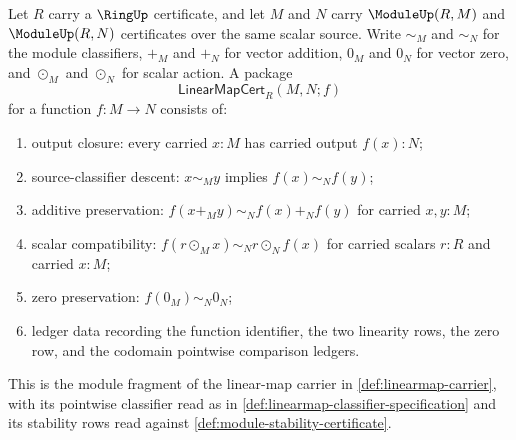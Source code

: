\begin{definition}
\label{def:module-linearmap-certificate-package}
Let $R$ carry a $\RingUp$ certificate, and let $M$ and $N$ carry $\ModuleUp(R,M)$ and $\ModuleUp(R,N)$ certificates over the same scalar source. Write $\sim_M$ and $\sim_N$ for the module classifiers, $+_M$ and $+_N$ for vector addition, $0_M$ and $0_N$ for vector zero, and $\odot_M$ and $\odot_N$ for scalar action. A package
$$
\mathsf{LinearMapCert}_R(M,N;f)
$$
for a function $f:M\to N$ consists of:
\begin{enumerate}
  \item output closure: every carried $x:M$ has carried output $f(x):N$;
  \item source-classifier descent: $x\sim_M y$ implies $f(x)\sim_N f(y)$;
  \item additive preservation: $f(x+_M y)\sim_N f(x)+_N f(y)$ for carried $x,y:M$;
  \item scalar compatibility: $f(r\odot_M x)\sim_N r\odot_N f(x)$ for carried scalars $r:R$ and carried $x:M$;
  \item zero preservation: $f(0_M)\sim_N0_N$;
  \item ledger data recording the function identifier, the two linearity rows, the zero row, and the codomain pointwise comparison ledgers.
\end{enumerate}
This is the module fragment of the linear-map carrier in \autoref{def:linearmap-carrier}, with its pointwise classifier read as in \autoref{def:linearmap-classifier-specification} and its stability rows read against \autoref{def:module-stability-certificate}.
\end{definition}

